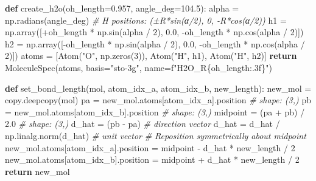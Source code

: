 \documentclass[
  11pt,
]{report}
\newenvironment{Shaded}{}{}
\newcommand{\CommentTok}[1]{\textcolor[rgb]{0.38,0.63,0.69}{\textit{#1}}}
\newcommand{\ControlFlowTok}[1]{\textcolor[rgb]{0.00,0.44,0.13}{\textbf{#1}}}
\newcommand{\DecValTok}[1]{\textcolor[rgb]{0.25,0.63,0.44}{#1}}
\newcommand{\FloatTok}[1]{\textcolor[rgb]{0.25,0.63,0.44}{#1}}
\newcommand{\KeywordTok}[1]{\textcolor[rgb]{0.00,0.44,0.13}{\textbf{#1}}}
\newcommand{\NormalTok}[1]{#1}
\newcommand{\OperatorTok}[1]{\textcolor[rgb]{0.40,0.40,0.40}{#1}}
\newcommand{\SpecialCharTok}[1]{\textcolor[rgb]{0.25,0.44,0.63}{#1}}
\newcommand{\SpecialStringTok}[1]{\textcolor[rgb]{0.73,0.40,0.53}{#1}}
\newcommand{\StringTok}[1]{\textcolor[rgb]{0.25,0.44,0.63}{#1}}
\begin{document}
\begin{Shaded}
\begin{Highlighting}[]
\KeywordTok{def}\NormalTok{ create\_h2o(oh\_length}\OperatorTok{=}\FloatTok{0.957}\NormalTok{, angle\_deg}\OperatorTok{=}\FloatTok{104.5}\NormalTok{):}
\NormalTok{    alpha }\OperatorTok{=}\NormalTok{ np.radians(angle\_deg)}
    \CommentTok{\# H positions: (±R*sin(α/2), 0, {-}R*cos(α/2))}
\NormalTok{    h1 }\OperatorTok{=}\NormalTok{ np.array([}\OperatorTok{+}\NormalTok{oh\_length }\OperatorTok{*}\NormalTok{ np.sin(alpha }\OperatorTok{/} \DecValTok{2}\NormalTok{), }\FloatTok{0.0}\NormalTok{,}
                    \OperatorTok{{-}}\NormalTok{oh\_length }\OperatorTok{*}\NormalTok{ np.cos(alpha }\OperatorTok{/} \DecValTok{2}\NormalTok{)])}
\NormalTok{    h2 }\OperatorTok{=}\NormalTok{ np.array([}\OperatorTok{{-}}\NormalTok{oh\_length }\OperatorTok{*}\NormalTok{ np.sin(alpha }\OperatorTok{/} \DecValTok{2}\NormalTok{), }\FloatTok{0.0}\NormalTok{,}
                    \OperatorTok{{-}}\NormalTok{oh\_length }\OperatorTok{*}\NormalTok{ np.cos(alpha }\OperatorTok{/} \DecValTok{2}\NormalTok{)])}
\NormalTok{    atoms }\OperatorTok{=}\NormalTok{ [Atom(}\StringTok{"O"}\NormalTok{, np.zeros(}\DecValTok{3}\NormalTok{)), Atom(}\StringTok{"H"}\NormalTok{, h1), Atom(}\StringTok{"H"}\NormalTok{, h2)]}
    \ControlFlowTok{return}\NormalTok{ MoleculeSpec(atoms, basis}\OperatorTok{=}\StringTok{"sto{-}3g"}\NormalTok{, name}\OperatorTok{=}\SpecialStringTok{f"H2O\_R}\SpecialCharTok{\{}\NormalTok{oh\_length}\SpecialCharTok{:.3f\}}\SpecialStringTok{"}\NormalTok{)}


\KeywordTok{def}\NormalTok{ set\_bond\_length(mol, atom\_idx\_a, atom\_idx\_b, new\_length):}
\NormalTok{    new\_mol }\OperatorTok{=}\NormalTok{ copy.deepcopy(mol)}
\NormalTok{    pa }\OperatorTok{=}\NormalTok{ new\_mol.atoms[atom\_idx\_a].position  }\CommentTok{\# shape: (3,)}
\NormalTok{    pb }\OperatorTok{=}\NormalTok{ new\_mol.atoms[atom\_idx\_b].position  }\CommentTok{\# shape: (3,)}
\NormalTok{    midpoint }\OperatorTok{=}\NormalTok{ (pa }\OperatorTok{+}\NormalTok{ pb) }\OperatorTok{/} \FloatTok{2.0}               \CommentTok{\# shape: (3,)}
\NormalTok{    d\_hat }\OperatorTok{=}\NormalTok{ (pb }\OperatorTok{{-}}\NormalTok{ pa)                        }\CommentTok{\# direction vector}
\NormalTok{    d\_hat }\OperatorTok{=}\NormalTok{ d\_hat }\OperatorTok{/}\NormalTok{ np.linalg.norm(d\_hat)    }\CommentTok{\# unit vector}
    \CommentTok{\# Reposition symmetrically about midpoint}
\NormalTok{    new\_mol.atoms[atom\_idx\_a].position }\OperatorTok{=}\NormalTok{ midpoint }\OperatorTok{{-}}\NormalTok{ d\_hat }\OperatorTok{*}\NormalTok{ new\_length }\OperatorTok{/} \DecValTok{2}
\NormalTok{    new\_mol.atoms[atom\_idx\_b].position }\OperatorTok{=}\NormalTok{ midpoint }\OperatorTok{+}\NormalTok{ d\_hat }\OperatorTok{*}\NormalTok{ new\_length }\OperatorTok{/} \DecValTok{2}
    \ControlFlowTok{return}\NormalTok{ new\_mol}
\end{Highlighting}
\end{Shaded}
\end{document}
